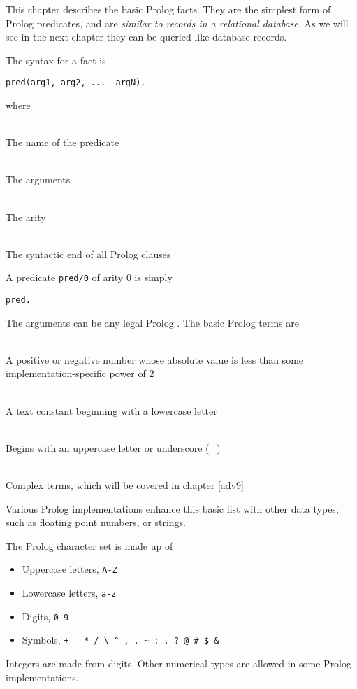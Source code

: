 \label{adv2}\secdown

This chapter describes the basic Prolog facts. They are the simplest form of
Prolog predicates, and are \emph{similar to records in a relational database}.
As we will see in the next chapter they can be queried like database records.

The syntax for a fact is
\begin{verbatim}
pred(arg1, arg2, ...  argN).
\end{verbatim}
where
\begin{description}[nosep]
\item[pred]\ \\The name of the predicate
\item[arg1,..]\ \\The arguments
\item[N]\ \\The arity
\item[.]\ \\The syntactic end of all Prolog clauses
\end{description}

\bigskip
A predicate \verb'pred/0' of arity 0 is simply
\begin{verbatim}
pred.
\end{verbatim}

The arguments can be any legal Prolog . The basic Prolog terms are
\begin{description}[nosep]
\item[integer]\ \\A positive or negative number whose absolute value is less
than some implementation-specific power of 2
\item[atom]\ \\A text constant beginning with a lowercase letter
\item[variable]\ \\Begins with an uppercase letter or underscore (\_)
\item[structure]\ \\Complex terms, which will be covered in chapter \ref{adv9}
\end{description}

Various Prolog implementations enhance this basic list with other data types,
such as floating point numbers, or strings.

The Prolog character set is made up of
\begin{itemize}[nosep]
  \item 
Uppercase letters, \verb|A-Z|
  \item 
Lowercase letters, \verb|a-z|
  \item 
Digits, \verb|0-9|
  \item 
Symbols, \verb|+ - * / \ ^ , . ~ : . ? @ # $ &|
\end{itemize}
Integers are made from digits. Other numerical types are allowed in some Prolog implementations.

